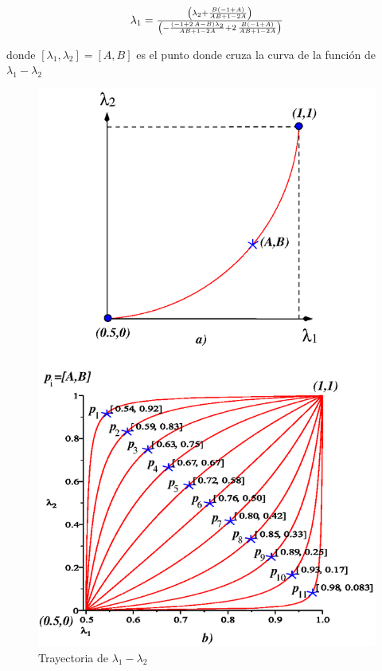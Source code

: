 \documentclass[conference,letterpaper,onecolumn]{IEEEtran}
\begin{document}
\begin{equation}
\begin{array}{l}
\lambda_{{1}}={ \left( \lambda_{{2}}+{\frac {B \left( - 1+A \right) }
{AB+ 1- 2A}} \right) \over  \left( -{\frac { \left( - 1+ 2\,
A- B \right) \lambda_{{2}}}{AB+ 1- 2A}}+ 2\,{\frac {B
 \left( - 1+A \right) }{AB+ 1- 2A}} \right) }
\end{array}
\label{homotopiaPx4}
\end{equation}

donde $[\lambda_1,\lambda_2]=[A,B]$ es el punto donde cruza la curva de la funci\'on de $\lambda_1-\lambda_2$

\begin{figure}[hbtp]
\centering
\includegraphics[scale=0.55]{fig/curvasl.eps}
\caption{Trayectoria  de $\lambda_1-\lambda_2$}
\label{curvasl}
\end{figure}
\end{document}
